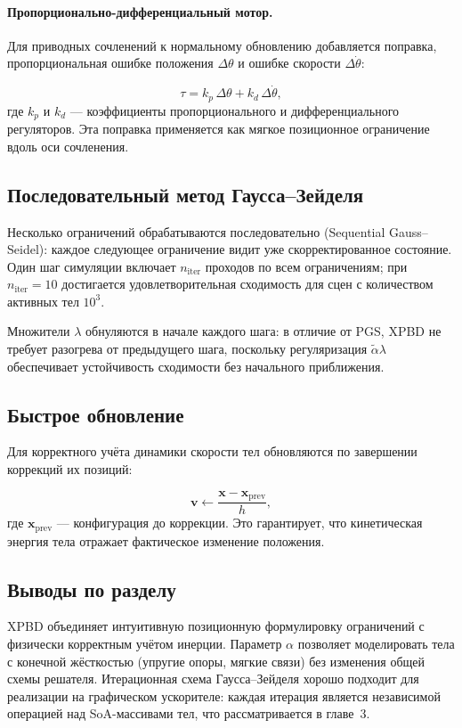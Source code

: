 \paragraph{Пропорционально-дифференциальный мотор.} Для приводных сочленений к нормальному обновлению 
добавляется поправка, пропорциональная ошибке положения $\Delta\theta$ и ошибке скорости $\Delta\dot\theta$:

\begin{equation}
  \tau = k_p\,\Delta\theta + k_d\,\Delta\dot\theta,
\end{equation}
где $k_p$ и $k_d$ --- коэффициенты пропорционального и дифференциального регуляторов.
Эта поправка применяется как мягкое позиционное ограничение вдоль оси сочленения.

\subsection{Последовательный метод Гаусса--Зейделя}

Несколько ограничений обрабатываются последовательно (Sequential Gauss--Seidel):
каждое следующее ограничение видит уже скорректированное состояние.
Один шаг симуляции включает $n_{\text{iter}}$ проходов по всем ограничениям;
при $n_{\text{iter}} = 10$ достигается удовлетворительная сходимость для
сцен с количеством активных тел $10^3$.

Множители $\lambda$ обнуляются в начале каждого шага:
в отличие от PGS, XPBD не требует разогрева от предыдущего шага, поскольку
регуляризация $\tilde{\alpha}\lambda$ обеспечивает устойчивость сходимости
без начального приближения.

\subsection{Быстрое обновление}

Для корректного учёта динамики скорости тел обновляются по завершении коррекций их позиций:

\begin{equation}
  \mathbf{v} \leftarrow \frac{\mathbf{x} - \mathbf{x}_{\text{prev}}}{h},
  \label{eq:vel-update}
\end{equation}
где $\mathbf{x}_{\text{prev}}$ --- конфигурация до коррекции.
Это гарантирует, что кинетическая энергия тела отражает фактическое изменение положения.

\subsection{Выводы по разделу}

XPBD объединяет интуитивную позиционную формулировку ограничений с физически корректным учётом инерции. 
Параметр $\alpha$ позволяет моделировать тела с конечной жёсткостью (упругие опоры, мягкие связи) без 
изменения общей схемы решателя. Итерационная схема Гаусса--Зейделя хорошо подходит для реализации на 
графическом ускорителе: каждая итерация является независимой операцией над SoA-массивами тел, что 
рассматривается в главе~3.
